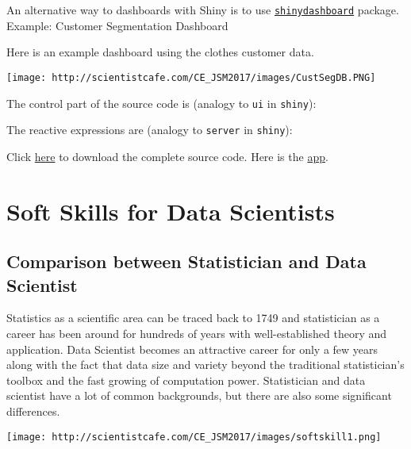 \documentclass[
]{article}
\begin{document}
An alternative way to dashboards with Shiny is to use
\href{https://rstudio.github.io/shinydashboard/}{\texttt{shinydashboard}}
package. Example: Customer Segmentation Dashboard

Here is an example dashboard using the clothes customer data.

\texttt{[image: http://scientistcafe.com/CE\_JSM2017/images/CustSegDB.PNG]}

The control part of the source code is (analogy to \texttt{ui} in
\texttt{shiny}):

The reactive expressions are (analogy to \texttt{server} in
\texttt{shiny}):

Click
\href{https://raw.githubusercontent.com/happyrabbit/linhui.org/gh-pages/CE_JSM2017/Examples/segmentdb.Rmd}{here}
to download the complete source code. Here is the
\href{https://scientistcafe.shinyapps.io/shinysample/}{app}.

\hypertarget{soft-skills-for-data-scientists}{%
\section{Soft Skills for Data
Scientists}\label{soft-skills-for-data-scientists}}

\hypertarget{comparison-between-statistician-and-data-scientist}{%
\subsection{Comparison between Statistician and Data
Scientist}\label{comparison-between-statistician-and-data-scientist}}

Statistics as a scientific area can be traced back to 1749 and
statistician as a career has been around for hundreds of years with
well-established theory and application. Data Scientist becomes an
attractive career for only a few years along with the fact that data
size and variety beyond the traditional statistician's toolbox and the
fast growing of computation power. Statistician and data scientist have
a lot of common backgrounds, but there are also some significant
differences.

\texttt{[image: http://scientistcafe.com/CE\_JSM2017/images/softskill1.png]}
\end{document}
